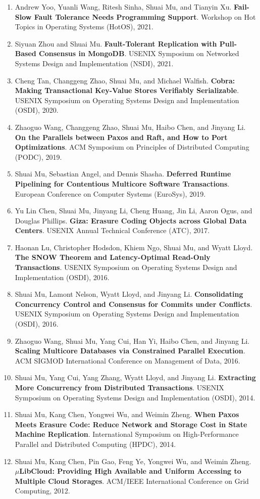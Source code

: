 \documentclass[10pt,letterpaper]{article}
\newcommand{\cvsection}[1]{\Needspace{4\baselineskip}\vspace{8pt}{\large\bfseries #1}\par\vspace{3pt}}
\newcommand{\pub}[3]{\item #1. \textbf{#2}. #3.}
\begin{document}
\newpage
\cvsection{Publications (continued)}
\begin{enumerate}[start=13]
\pub{Andrew Yoo, Yuanli Wang, Ritesh Sinha, Shuai Mu, and Tianyin Xu}{Fail-Slow Fault Tolerance Needs Programming Support}{Workshop on Hot Topics in Operating Systems (HotOS), 2021}
\pub{Siyuan Zhou and Shuai Mu}{Fault-Tolerant Replication with Pull-Based Consensus in MongoDB}{USENIX Symposium on Networked Systems Design and Implementation (NSDI), 2021}
\pub{Cheng Tan, Changgeng Zhao, Shuai Mu, and Michael Walfish}{Cobra: Making Transactional Key-Value Stores Verifiably Serializable}{USENIX Symposium on Operating Systems Design and Implementation (OSDI), 2020}
\pub{Zhaoguo Wang, Changgeng Zhao, Shuai Mu, Haibo Chen, and Jinyang Li}{On the Parallels between Paxos and Raft, and How to Port Optimizations}{ACM Symposium on Principles of Distributed Computing (PODC), 2019}
\pub{Shuai Mu, Sebastian Angel, and Dennis Shasha}{Deferred Runtime Pipelining for Contentious Multicore Software Transactions}{European Conference on Computer Systems (EuroSys), 2019}
\pub{Yu Lin Chen, Shuai Mu, Jinyang Li, Cheng Huang, Jin Li, Aaron Ogus, and Douglas Phillips}{Giza: Erasure Coding Objects across Global Data Centers}{USENIX Annual Technical Conference (ATC), 2017}
\pub{Haonan Lu, Christopher Hodsdon, Khiem Ngo, Shuai Mu, and Wyatt Lloyd}{The SNOW Theorem and Latency-Optimal Read-Only Transactions}{USENIX Symposium on Operating Systems Design and Implementation (OSDI), 2016}
\pub{Shuai Mu, Lamont Nelson, Wyatt Lloyd, and Jinyang Li}{Consolidating Concurrency Control and Consensus for Commits under Conflicts}{USENIX Symposium on Operating Systems Design and Implementation (OSDI), 2016}
\pub{Zhaoguo Wang, Shuai Mu, Yang Cui, Han Yi, Haibo Chen, and Jinyang Li}{Scaling Multicore Databases via Constrained Parallel Execution}{ACM SIGMOD International Conference on Management of Data, 2016}
\pub{Shuai Mu, Yang Cui, Yang Zhang, Wyatt Lloyd, and Jinyang Li}{Extracting More Concurrency from Distributed Transactions}{USENIX Symposium on Operating Systems Design and Implementation (OSDI), 2014}
\pub{Shuai Mu, Kang Chen, Yongwei Wu, and Weimin Zheng}{When Paxos Meets Erasure Code: Reduce Network and Storage Cost in State Machine Replication}{International Symposium on High-Performance Parallel and Distributed Computing (HPDC), 2014}
\pub{Shuai Mu, Kang Chen, Pin Gao, Feng Ye, Yongwei Wu, and Weimin Zheng}{$\mu$LibCloud: Providing High Available and Uniform Accessing to Multiple Cloud Storages}{ACM/IEEE International Conference on Grid Computing, 2012}
\end{enumerate}
\end{document}
